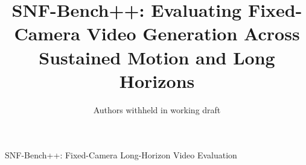 \title{SNF-Bench++: Evaluating Fixed-Camera Video Generation Across Sustained Motion and Long Horizons}
\author{Authors withheld in working draft}
%
{SNF-Bench++: Fixed-Camera Long-Horizon Video Evaluation}

